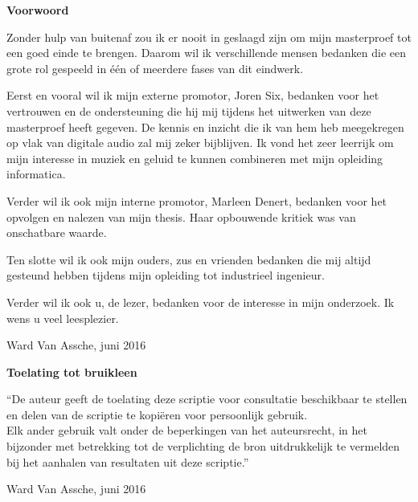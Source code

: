 
\newpage

\noindent \textbf{\huge Voorwoord}

\vspace{1.5cm}

\noindent

Zonder hulp van buitenaf zou ik er nooit in geslaagd zijn om mijn masterproef tot een goed einde te brengen. Daarom wil ik verschillende mensen bedanken die een grote rol gespeeld in één of meerdere fases van dit eindwerk.

Eerst en vooral wil ik mijn externe promotor, Joren Six, bedanken voor het vertrouwen en de ondersteuning die hij mij tijdens het uitwerken van deze masterproef heeft gegeven. De kennis en inzicht die ik van hem heb meegekregen op vlak van digitale audio zal mij zeker bijblijven. Ik vond het zeer leerrijk om mijn interesse in muziek en geluid te kunnen combineren met mijn opleiding informatica.

Verder wil ik ook mijn interne promotor, Marleen Denert, bedanken voor het opvolgen en nalezen van mijn thesis. Haar opbouwende kritiek was van onschatbare waarde.

Ten slotte wil ik ook mijn ouders, zus en vrienden bedanken die mij altijd gesteund hebben tijdens mijn opleiding tot industrieel ingenieur.

Verder wil ik ook u, de lezer, bedanken voor de interesse in mijn onderzoek. Ik wens u veel leesplezier.

\addvspace{2.5cm}

\noindent Ward Van Assche, juni 2016\newpage

\noindent \textbf{\huge Toelating tot bruikleen}

\vspace{1.5cm}

\noindent
``De auteur geeft de toelating deze scriptie voor consultatie beschikbaar
te stellen en delen van de scriptie te kopi\"eren voor persoonlijk
gebruik.\\
Elk ander gebruik valt onder de beperkingen van het auteursrecht,
in het bijzonder met betrekking tot de verplichting de bron uitdrukkelijk
te vermelden bij het aanhalen van resultaten uit deze scriptie.''

\addvspace{4cm}

\noindent Ward Van Assche, juni 2016
